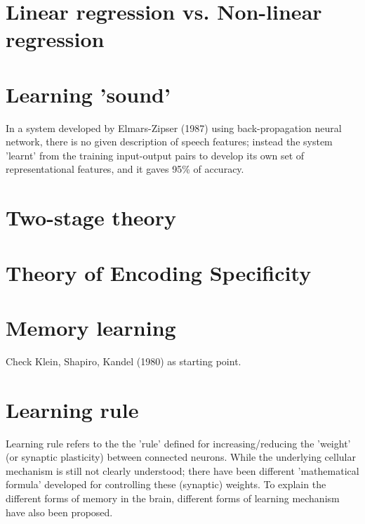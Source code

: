 \section{Linear regression vs. Non-linear regression}





\section{Learning 'sound'}
\label{sec:learning-sound}

In a system developed by Elmars-Zipser (1987) using back-propagation neural
network, there is no given description of speech features; instead the system
'learnt' from the training input-output pairs to develop its own set of
representational features, and it gaves 95\% of accuracy.




\section{Two-stage theory}
\label{sec:two-stage-theory}
\label{sec:austin-simonson-theory}

\section{Theory of Encoding Specificity}
\label{sec:theory-of-encoding-specificity}

\section{Memory learning}
\label{sec:memory-learning}

Check Klein, Shapiro, Kandel (1980) as starting point. 

\section{Learning rule}
\label{sec:learning-rule}

Learning rule refers to the the 'rule' defined for increasing/reducing the
'weight' (or synaptic plasticity) between connected neurons. While the
underlying cellular  mechanism is still not clearly understood; there have been
different 'mathematical formula' developed for controlling these (synaptic)
weights. To explain the different forms of memory in the brain, different forms
of learning mechanism have also been proposed.

